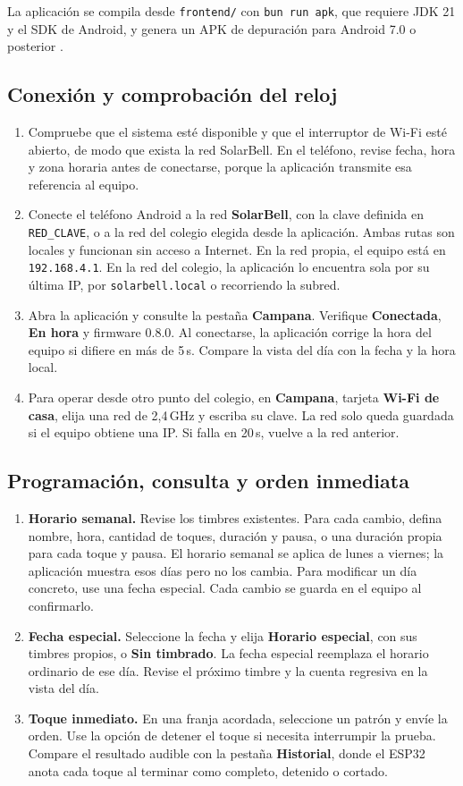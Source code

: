 \documentclass[a4paper,11pt]{article}
\newcommand{\pin}[1]{\texttt{#1}}
\begin{document}
La aplicación se compila desde \pin{frontend/} con \pin{bun run apk}, que requiere JDK 21 y el SDK de Android, y genera un APK de depuración para Android 7.0 o posterior \cite{repo}.

\subsection{Conexión y comprobación del reloj}
\begin{enumerate}
  \item Compruebe que el sistema esté disponible y que el interruptor de Wi-Fi esté abierto, de modo que exista la red SolarBell. En el teléfono, revise fecha, hora y zona horaria antes de conectarse, porque la aplicación transmite esa referencia al equipo.
  \item Conecte el teléfono Android a la red \textbf{SolarBell}, con la clave definida en \pin{RED\_CLAVE}, o a la red del colegio elegida desde la aplicación. Ambas rutas son locales y funcionan sin acceso a Internet. En la red propia, el equipo está en \pin{192.168.4.1}. En la red del colegio, la aplicación lo encuentra sola por su última IP, por \pin{solarbell.local} o recorriendo la subred.
  \item Abra la aplicación y consulte la pestaña \textbf{Campana}. Verifique \textbf{Conectada}, \textbf{En hora} y firmware 0.8.0. Al conectarse, la aplicación corrige la hora del equipo si difiere en más de 5\,s. Compare la vista del día con la fecha y la hora local.
  \item Para operar desde otro punto del colegio, en \textbf{Campana}, tarjeta \textbf{Wi-Fi de casa}, elija una red de 2,4\,GHz y escriba su clave. La red solo queda guardada si el equipo obtiene una IP. Si falla en 20\,s, vuelve a la red anterior.
\end{enumerate}

\subsection{Programación, consulta y orden inmediata}
\begin{enumerate}
  \item \textbf{Horario semanal.} Revise los timbres existentes. Para cada cambio, defina nombre, hora, cantidad de toques, duración y pausa, o una duración propia para cada toque y pausa. El horario semanal se aplica de lunes a viernes; la aplicación muestra esos días pero no los cambia. Para modificar un día concreto, use una fecha especial. Cada cambio se guarda en el equipo al confirmarlo.
  \item \textbf{Fecha especial.} Seleccione la fecha y elija \textbf{Horario especial}, con sus timbres propios, o \textbf{Sin timbrado}. La fecha especial reemplaza el horario ordinario de ese día. Revise el próximo timbre y la cuenta regresiva en la vista del día.
  \item \textbf{Toque inmediato.} En una franja acordada, seleccione un patrón y envíe la orden. Use la opción de detener el toque si necesita interrumpir la prueba. Compare el resultado audible con la pestaña \textbf{Historial}, donde el ESP32 anota cada toque al terminar como completo, detenido o cortado.
\end{enumerate}
\end{document}
